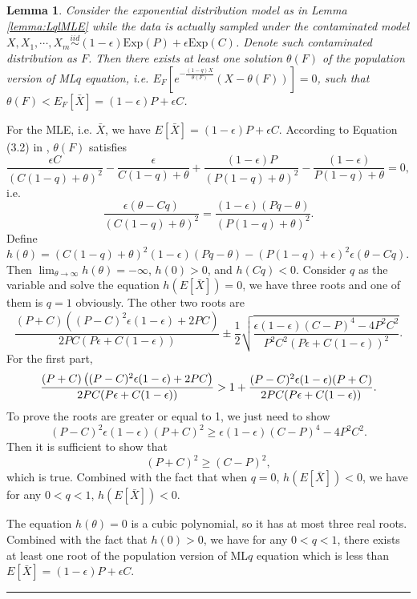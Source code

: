 \documentclass[a4paper]{article}
\newenvironment{proof}{{\bf Proof:  }}{\hfill\rule{2mm}{2mm}}
\newtheorem{lemma}[fact]{Lemma}
\begin{document}
\begin{lemma}
Consider the exponential distribution model as in Lemma \ref{lemma:LqlMLE} while the data is actually sampled under the contaminated model $X, X_1, \cdots, X_m \stackrel{iid}{\sim} (1-\epsilon) \mathrm{Exp}(P) + \epsilon \mathrm{Exp}(C)$. Denote such contaminated distribution as $F$.
Then there exists at least one solution $\theta(F)$ of the population version of ML$q$ equation,
i.e. $E_F[e^{-\frac{(1-q)X}{\theta(F)}}(X - \theta(F))] = 0$, such that $\theta(F) < E_F[\bar{X}] = (1-\epsilon) P + \epsilon C$.
\end{lemma}
\begin{proof}
For the MLE, i.e. $\bar{X}$, we have $E[\bar{X}] = (1-\epsilon) P + \epsilon C$.
According to Equation (3.2) in \cite{ferrari2010}, $\theta(F)$ satisfies
\[
\frac{\epsilon C}{(C(1-q) + \theta)^2} - \frac{\epsilon}{C(1-q) + \theta}
+\frac{(1-\epsilon) P}{(P(1-q) + \theta)^2} - \frac{(1-\epsilon)}{P(1-q) + \theta}
= 0,
\]
i.e.
\[
\frac{\epsilon (\theta - Cq)}{(C(1-q) + \theta)^2} =
\frac{(1-\epsilon) (P q - \theta)}{(P(1-q) + \theta)^2}.
\]
Define $h(\theta) = (C(1-q) + \theta)^2 (1-\epsilon) (P q - \theta) - (P(1-q) + \epsilon)^2 \epsilon (\theta - Cq)$.
Then $\lim_{\theta \to \infty}h(\theta) = -\infty$, $h(0) > 0$, and $h(Cq) < 0$.
Consider $q$ as the variable and solve the equation $h(E[\bar{X}]) = 0$, we have three roots and one of them is $q = 1$ obviously.
The other two roots are
\[
\frac{(P + C)\left( (P-C)^2 \epsilon(1-\epsilon) + 2PC \right)}{2PC(P \epsilon + C(1-\epsilon))}
\pm \frac{1}{2} \sqrt{\frac{\epsilon(1-\epsilon)(C-P)^4 - 4P^2C^2}{P^2 C^2 (P\epsilon + C(1-\epsilon))^2}}.
\]
For the first part,
\[
\frac{(P + C)\left( (P-C)^2 \epsilon(1-\epsilon) + 2PC \right)}{2PC(P \epsilon + C(1-\epsilon))}\\
> 1 + \frac{(P-C)^2 \epsilon (1-\epsilon) (P+C)}{2PC(P \epsilon + C(1-\epsilon))}.
\]
To prove the roots are greater or equal to 1, we just need to show
\[
(P-C)^2 \epsilon (1-\epsilon) (P+C)^2
\ge \epsilon(1-\epsilon)(C-P)^4 - 4P^2C^2.
\]
Then it is sufficient to show that
\[
(P+C)^2 \ge (C-P)^2,
\]
which is true.
Combined with the fact that when $q = 0$, $h(E[\bar{X}]) < 0$, we have for any $0 < q < 1$, $h(E[\bar{X}]) < 0$.

The equation $h(\theta) = 0$ is a cubic polynomial, so it has at most three real roots. Combined with the fact that $h(0) > 0$, we have for any $0 < q < 1$, there exists at least one root of the population version of ML$q$ equation which is less than $E[\bar{X}] = (1-\epsilon)P + \epsilon C$.
\end{proof}
\end{document}
